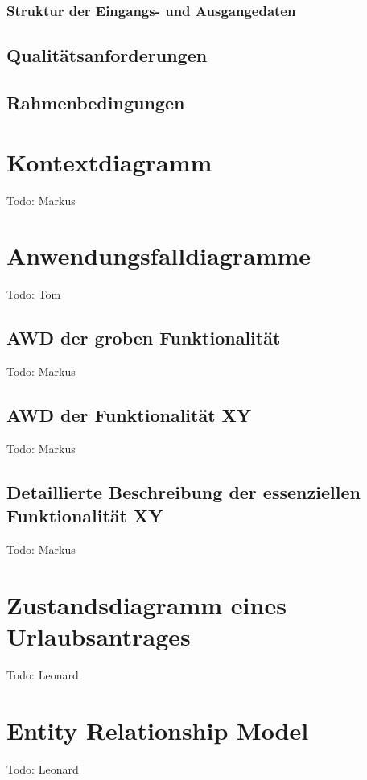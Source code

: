 \subsection{Struktur der Eingangs- und Ausgangedaten}

\section{Qualit\"atsanforderungen}

\section{Rahmenbedingungen}

\chapter{Kontextdiagramm}
Todo: Markus
\chapter{Anwendungsfalldiagramme}
Todo: Tom
\section{AWD der groben Funktionalität}
Todo: Markus
\section{AWD der Funktionalität XY}
Todo: Markus
\section{Detaillierte Beschreibung der essenziellen Funktionalität XY}
Todo: Markus
\chapter{Zustandsdiagramm eines Urlaubsantrages}
Todo: Leonard
\chapter{Entity Relationship Model}
Todo: Leonard

% 
% 

\clearpage
\thispagestyle{empty}


